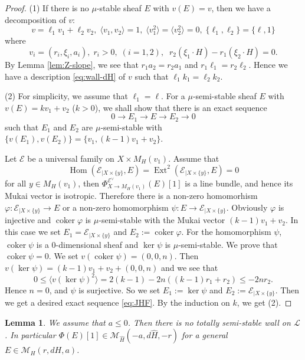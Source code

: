 \documentclass[10pt]{amsart}
\def\cal{\mathcal}
\newcommand{\Ext}{\operatorname{Ext}}
\newcommand{\Hom}{\operatorname{Hom}}
\newcommand{\coker}{\operatorname{coker}}
\numberwithin{equation}{section}
\theoremstyle{plain}
\newtheorem{lem}[thm]{Lemma}
\theoremstyle{definition}
\theoremstyle{remark}
\begin{document}
\begin{proof}
(1)
If there is no $\mu$-stable sheaf $E$ with $v(E)=v$, then
we have a decomposition of $v$:
\begin{equation}
v=\ell_1 v_1+\ell_2 v_2,\;\langle v_1,v_2 \rangle=1,\; \langle v_1^2 \rangle=\langle v_2^2 \rangle=0,\;
 \{\ell_1,\ell_2 \}=\{ \ell,1 \}
\end{equation}
where 
\begin{equation}
v_i=(r_i,\xi_i,a_i),\;r_i>0,\; (i=1,2),\;\; r_2(\xi_1 \cdot H)-r_1(\xi_2 \cdot H)=0.
\end{equation}
By Lemma \ref{lem:Z-slope}, we see that $r_1 a_2=r_2 a_1$ and $r_1 \ell_1=r_2 \ell_2$.
Hence we have a description \eqref{eq:wall-dH} of $v$ such that $\ell_1 k_1=\ell_2 k_2$.

(2)
For simplicity, we assume that $\ell_1=\ell$.
For a $\mu$-semi-stable sheaf $E$ with $v(E)=kv_1+v_2$ ($k>0$), 
we shall show that there is an exact sequence
\begin{equation}\label{eq:JHF}
0 \to E_1 \to E \to E_2 \to 0
\end{equation}
such that $E_1$ and $E_2$ are $\mu$-semi-stable with
$\{v(E_1),v(E_2) \}=\{v_1,(k-1)v_1+v_2 \}$.

Let ${\cal E}$ be a universal family on $X \times M_H(v_1)$.
Assume that 
$$
\Hom({\cal E}_{|X \times \{ y \}},E)=\Ext^2({\cal E}_{|X \times \{ y \}},E)=0
$$
for all $y \in M_H(v_1)$, then 
$\Phi_{X \to M_H(v_1)}^{{\cal E}^{\vee}}(E)[1]$ is a line bundle, and hence
its Mukai vector is isotropic.
Therefore there is a non-zero homomorhism
$\varphi:{\cal E}_{|X \times \{ y \}} \to E$ or a non-zero homomorphism
$\psi:E \to {\cal E}_{|X \times \{ y \}}$.
Obviously $\varphi$ is injective and $\coker \varphi$ is $\mu$-semi-stable with
the Mukai vector $(k-1)v_1+v_2$.
In this case we set $E_1={\cal E}_{|X \times \{ y \}}$ and $E_2:=\coker \varphi$.
For the homomorphism $\psi$,
$\coker \psi$ is a 0-dimensional sheaf and $\ker \psi$ is $\mu$-semi-stable.
We prove that $\coker \psi=0$.
We set $v(\coker \psi)=(0,0,n)$. Then 
$v(\ker\psi)=(k-1)v_1+v_2+(0,0,n)$ and 
we see that
$$
0 \leq \langle v(\ker \psi)^2 \rangle=2(k-1)-2n((k-1)r_1+r_2) \leq -2nr_2.
$$
Hence $n=0$, and $\psi$ is surjective.
So we set $E_1:=\ker \psi$ and $E_2:={\cal E}_{|X \times \{ y \}}$.
Then we get a desired exact sequence \eqref{eq:JHF}.
By the induction on $k$, we get (2).
\end{proof}


\begin{lem}\label{lem:wall-dH2}
We assume that $a \leq 0$.
Then there is no totally semi-stable wall on ${\cal L}$.
In particular $\Phi(E)[1] \in {\cal M}_{\widehat{H}}(-a,d\widehat{H},-r)$
for a general $E \in {\cal M}_H(r,dH,a)$.
\end{lem}
\end{document}
